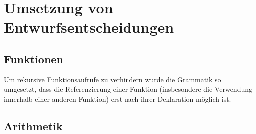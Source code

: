 \section{Umsetzung von Entwurfsentscheidungen}
\subsection{Funktionen}
Um rekursive Funktionsaufrufe zu verhindern wurde die Grammatik so umgesetzt, dass die Referenzierung einer Funktion (insbesondere die Verwendung innerhalb einer anderen Funktion) erst nach ihrer Deklaration möglich ist.

\subsection{Arithmetik}
